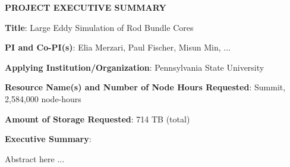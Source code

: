 \documentclass[11pt,letterpaper,english]{article}
\begin{document}
\setlength{\parindent}{0in} %

\pagestyle{fancy}   \renewcommand{%
\headrulewidth}{0.0pt}

\begin{center}
\bf {PROJECT EXECUTIVE SUMMARY} \\
\end{center}



\bigskip

\textbf{Title}: Large Eddy Simulation of Rod Bundle Cores \smallskip

\textbf{PI and Co-PI(s)}: Elia Merzari, Paul Fischer, Misun Min, ... \smallskip

\textbf{Applying Institution/Organization}: Pennsylvania State University \smallskip

\textbf{Resource Name(s) and Number of Node Hours Requested}: Summit, 2,584,000 node-hours \smallskip

\textbf{Amount of Storage Requested}: 714 TB (total) \smallskip

\textbf{Executive Summary}: \\

\vspace{.15in}

Abstract here ...

\end{document}
